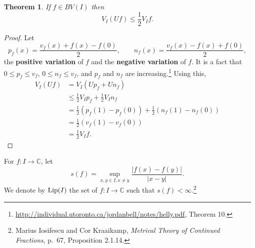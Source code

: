 \documentclass{article}
\newcommand{\Lip}{\ensuremath\mathrm{Lip}}
\newtheorem{theorem}{Theorem}
\theoremstyle{definition}
\begin{document}
\begin{theorem}
If $f \in BV(I)$ then
\[
V_I (Uf) \leq \frac{1}{2} V_I f.
\]
\end{theorem}
\begin{proof}
Let 
\[
p_f(x) = \frac{v_f(x)+f(x)-f(0)}{2},\qquad n_f(x) = \frac{v_f(x)-f(x)+f(0)}{2},
\]
the \textbf{positive variation} of $f$ and the \textbf{negative variation} of $f$.
It is a fact that $0 \leq p_f \leq v_f$, $0 \leq n_f \leq v_f$, 
and $p_f$ and $n_f$ are increasing.\footnote{\url{http://individual.utoronto.ca/jordanbell/notes/helly.pdf},
Theorem 10.}
Using this,
\begin{align*}
V_I (Uf)&=V_I(Up_f+Un_f)\\
&\leq \frac{1}{2}V_I p_f + \frac{1}{2} V_I n_f\\
&=\frac{1}{2}(p_f(1)-p_f(0)) + \frac{1}{2}(n_f(1)-n_f(0))\\
&=\frac{1}{2}(v_f(1)-v_f(0))\\
&=\frac{1}{2}V_I f.
\end{align*}
\end{proof}


For $f:I \to \mathbb{C}$,  let
\[
s(f) = \sup_{x,y \in I, x \neq y} \frac{|f(x)-f(y)|}{|x-y|}.
\]
We denote by $\Lip(I)$ the set of $f:I \to \mathbb{C}$ such that $s(f)<\infty$.\footnote{Marius Iosifescu and Cor Kraaikamp,
{\em Metrical Theory of Continued Fractions}, p.~67, Proposition 2.1.14.}
\end{document}
